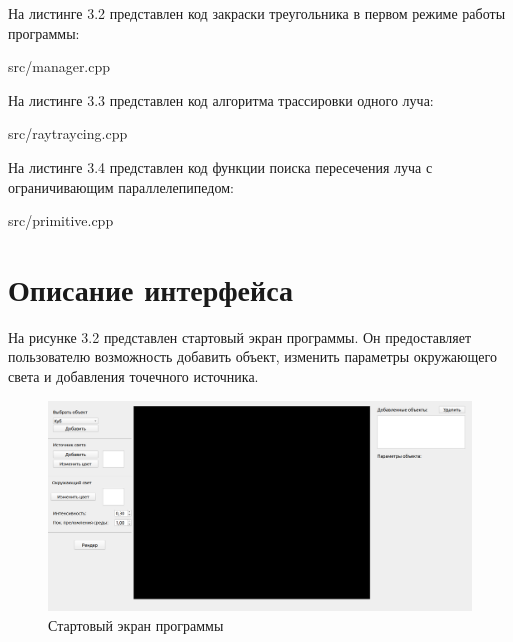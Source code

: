 На листинге 3.2 представлен код закраски треугольника в первом режиме работы программы:
\FloatBarrier
\begin{lstinputlisting}[language=C++, caption=Код закраски треугольника в первом режиме работы программы, 
	linerange={120-163}, basicstyle=\footnotesize\ttfamily, frame=single,breaklines=true]{src/manager.cpp}
\end{lstinputlisting}
\FloatBarrier

На листинге 3.3 представлен код алгоритма трассировки одного луча:
\FloatBarrier
\begin{lstinputlisting}[language=C++, caption=Код алгоритма трассировки, 
	linerange={44-115}, basicstyle=\footnotesize\ttfamily, frame=single,breaklines=true]{src/raytraycing.cpp}
\end{lstinputlisting}
\FloatBarrier

На листинге 3.4 представлен код функции поиска пересечения луча с ограничивающим параллелепипедом:

\FloatBarrier
\begin{lstinputlisting}[language=C++, caption=Код отрисовки модели в первом режиме работы программы, 
	linerange={45-74}, basicstyle=\footnotesize\ttfamily, frame=single,breaklines=true]{src/primitive.cpp}
\end{lstinputlisting}
\FloatBarrier

\section{Описание интерфейса}
На рисунке 3.2 представлен стартовый экран программы. 
Он предоставляет пользователю возможность добавить объект, изменить параметры окружающего света и добавления точечного источника.
\FloatBarrier
\begin{figure}[h]
	\begin{center}
		\includegraphics[width=\linewidth]{inc/start.png}
	\end{center}
	\caption{Стартовый экран программы}
\end{figure}
\FloatBarrier

